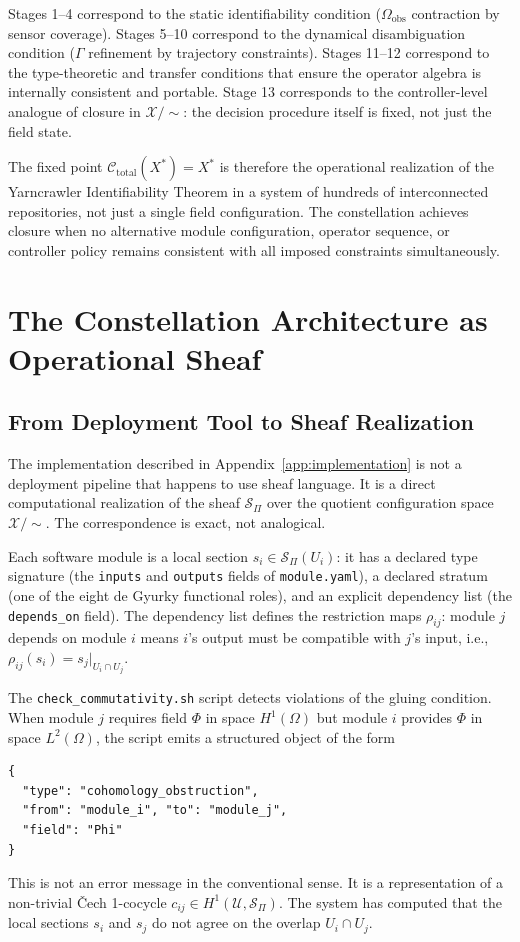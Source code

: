 \documentclass[12pt, oneside]{article}
\newcommand{\Xmod}{\mathcal{X}/{\sim}}
\begin{document}
Stages 1--4 correspond to the static identifiability condition ($\Omega_{\mathrm{obs}}$
contraction by sensor coverage). Stages 5--10 correspond to the dynamical disambiguation
condition ($\Gamma$ refinement by trajectory constraints). Stages 11--12 correspond to
the type-theoretic and transfer conditions that ensure the operator algebra is internally
consistent and portable. Stage 13 corresponds to the controller-level analogue of closure
in $\Xmod$: the decision procedure itself is fixed, not just the field state.

The fixed point $\mathcal{C}_{\mathrm{total}}(X^*) = X^*$ is therefore the operational
realization of the Yarncrawler Identifiability Theorem in a system of hundreds of
interconnected repositories, not just a single field configuration. The constellation
achieves closure when no alternative module configuration, operator sequence, or
controller policy remains consistent with all imposed constraints simultaneously.

\section{The Constellation Architecture as Operational Sheaf}
\label{app:constellation}

\subsection{From Deployment Tool to Sheaf Realization}

The implementation described in Appendix~\ref{app:implementation} is not a deployment
pipeline that happens to use sheaf language. It is a direct computational realization
of the sheaf $\mathcal{S}_\Pi$ over the quotient configuration space $\Xmod$. The
correspondence is exact, not analogical.

Each software module is a local section $s_i \in \mathcal{S}_\Pi(U_i)$: it has a
declared type signature (the \texttt{inputs} and \texttt{outputs} fields of
\texttt{module.yaml}), a declared stratum (one of the eight de Gyurky functional roles),
and an explicit dependency list (the \texttt{depends\_on} field). The dependency list
defines the restriction maps $\rho_{ij}$: module $j$ depends on module $i$ means $i$'s
output must be compatible with $j$'s input, i.e., $\rho_{ij}(s_i) = s_j|_{U_i \cap U_j}$.

The \texttt{check\_commutativity.sh} script detects violations of the gluing condition.
When module $j$ requires field $\Phi$ in space $H^1(\Omega)$ but module $i$ provides
$\Phi$ in space $L^2(\Omega)$, the script emits a structured object of the form
\begin{verbatim}
{
  "type": "cohomology_obstruction",
  "from": "module_i", "to": "module_j",
  "field": "Phi"
}
\end{verbatim}
This is not an error message in the conventional sense. It is a representation of a
non-trivial \v{C}ech 1-cocycle $c_{ij} \in H^1(\mathcal{U}, \mathcal{S}_\Pi)$. The
system has computed that the local sections $s_i$ and $s_j$ do not agree on the
overlap $U_i \cap U_j$.
\end{document}
